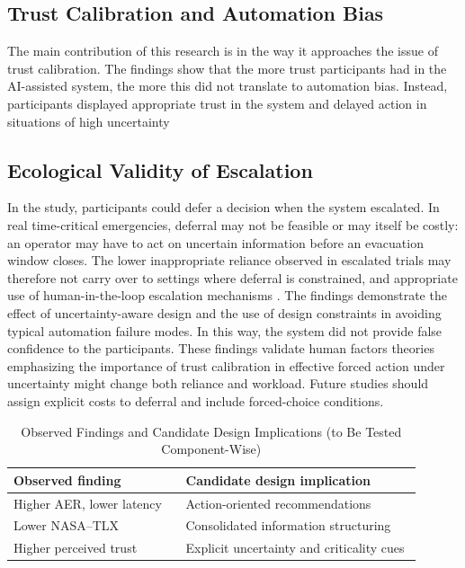 \documentclass[journal]{IEEEtran}
\theoremstyle{plain}
\theoremstyle{definition}
\providecommand{\DIFaddtex}[1]{{\protect\color{blue} \sf #1}} %
\providecommand{\DIFdeltex}[1]{{\protect\color{red} \scriptsize #1}} %
\providecommand{\DIFaddbegin}{} %
\providecommand{\DIFaddend}{} %
\providecommand{\DIFdelbegin}{} %
\providecommand{\DIFdelend}{} %
\providecommand{\DIFadd}[1]{\texorpdfstring{\DIFaddtex{#1}}{#1}} %
\providecommand{\DIFdel}[1]{\texorpdfstring{\DIFdeltex{#1}}{}} %
\newcommand{\DIFscaledelfig}{0.5}
\newlength{\DIFdelgraphicswidth} %
\newlength{\DIFdelgraphicsheight} %
\newcommand{\DIFaddincludegraphics}[2][]{{\color{blue}\fbox{\DIFOincludegraphics[#1]{#2}}}} %
\newcommand{\DIFdelincludegraphics}[2][]{%
\sbox{\DIFdelgraphicsbox}{\DIFOincludegraphics[#1]{#2}}%
\settoboxwidth{\DIFdelgraphicswidth}{\DIFdelgraphicsbox} %
\settoboxtotalheight{\DIFdelgraphicsheight}{\DIFdelgraphicsbox} %
\scalebox{\DIFscaledelfig}{%
\parbox[b]{\DIFdelgraphicswidth}{\usebox{\DIFdelgraphicsbox}\\[-\baselineskip] \rule{\DIFdelgraphicswidth}{0em}}\llap{\resizebox{\DIFdelgraphicswidth}{\DIFdelgraphicsheight}{%
\setlength{\unitlength}{\DIFdelgraphicswidth}%
\begin{picture}(1,1)%
\thicklines\linethickness{2pt} %
{\color[rgb]{1,0,0}\put(0,0){\framebox(1,1){}}}%
{\color[rgb]{1,0,0}\put(0,0){\line( 1,1){1}}}%
{\color[rgb]{1,0,0}\put(0,1){\line(1,-1){1}}}%
\end{picture}%
}\hspace*{3pt}}} %
} %
\DeclareRobustCommand{\DIFaddbegin}{\DIFOaddbegin \let\includegraphics\DIFaddincludegraphics} %
\DeclareRobustCommand{\DIFaddend}{\DIFOaddend \let\includegraphics\DIFOincludegraphics} %
\DeclareRobustCommand{\DIFdelbegin}{\DIFOdelbegin \let\includegraphics\DIFdelincludegraphics} %
\DeclareRobustCommand{\DIFdelend}{\DIFOaddend \let\includegraphics\DIFOincludegraphics} %
\begin{document}
\DIFdelbegin \subsection{\DIFdel{Trust Calibration and Automation Bias}}
\addtocounter{subsection}{-1}%
\DIFdel{The main contribution of this research is in the way it approaches the issue of trust calibration. The findings show that the more trust participants had in the AI-assisted system, the more this did not translate to automation bias. Instead, participants displayed appropriate trust in the system and delayed action in situations of high uncertainty }\DIFdelend \DIFaddbegin \subsection{\DIFadd{Ecological Validity of Escalation}}
\DIFadd{In the study, participants could defer a decision when the system escalated. In real time-critical emergencies, deferral may not be feasible or may itself be costly: an operator may have to act on uncertain information before an evacuation window closes. The lower inappropriate reliance observed in escalated trials may therefore not carry over to settings where deferral is constrained, }\DIFaddend and \DIFdelbegin \DIFdel{appropriate use of human-in-the-loop escalation mechanisms \cite{Raji2019AIES,Raji2022CACM,Weidinger2022FAccT}. The findings demonstrate the effect of uncertainty-aware design and the use of design constraints in avoiding typical automation failure modes.
In this way, the system did not provide false confidence to the participants. These findings validate human factors theories emphasizing the importance of trust calibration in effective }\DIFdelend \DIFaddbegin \DIFadd{forced action under uncertainty might change both reliance and workload. Future studies should assign explicit costs to deferral and include forced-choice conditions.
}

    \begin{table}[t]
        \caption{Observed Findings and Candidate Design Implications (to Be Tested Component-Wise)}
        \label{tab:design_implications}
        \centering
        \begin{tabular}{p{0.38\linewidth} p{0.52\linewidth}}
            \toprule
            Observed finding & Candidate design implication \\
            \midrule
            Higher AER, lower latency & Action-oriented recommendations \\
            Lower NASA--TLX & Consolidated information structuring \\
            Higher perceived trust & Explicit uncertainty and criticality cues \\
            \bottomrule
        \end{tabular}
    \end{table}
\end{document}
